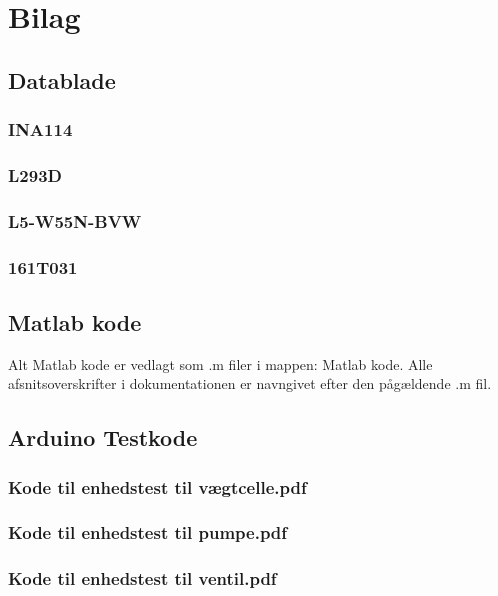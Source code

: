 \chapter{Bilag}
\section{Datablade}
\subsection{INA114}
\label{bilag:INA114}
\subsection{L293D}
\label{bilag:L293D}

\subsection{L5-W55N-BVW}
\label{bilag:L5-W55N-BVW}

\subsection{161T031}
\label{bilag:161T031}

\section{Matlab kode} \label{bilag:matlab}
Alt Matlab kode er vedlagt som .m filer i mappen: Matlab kode. Alle afsnitsoverskrifter i dokumentationen er navngivet efter den pågældende .m fil.  
\section{Arduino Testkode}
\subsection{Kode til enhedstest til vægtcelle.pdf} 
\label{bilag:TKloadcell}
\subsection{Kode til enhedstest til pumpe.pdf}
\label{bilag:TKpumpe}
\subsection{Kode til enhedstest til ventil.pdf}
\label{bilag:TKventil}
